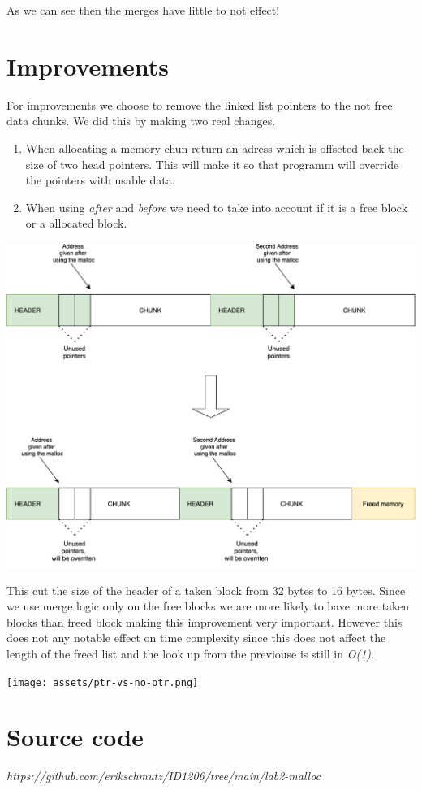 \documentclass{article}
\begin{document}
As we can see then the merges have little to not effect!

\section{Improvements}

For improvements we choose to remove the linked list pointers to the not free data chunks. We did this by making two real changes.

\begin{enumerate}
    \item When allocating a memory chun return an adress which is offseted back the size of two head pointers. This will make it so that programm will override the pointers with usable data.
    \item When using \emph{after} and \emph{before} we need to take into account if it is a free block or a allocated block. 
\end{enumerate}



\begin{center}
    \includegraphics[scale=0.12]{images/no-pointer-on-taken.png}
\end{center}
     
     
This cut the size of the header of a taken block from 32 bytes to 16 bytes. Since we use merge logic only on the free blocks we are more likely to have more taken blocks than freed block making this improvement very important. 
However this does not any notable effect on time complexity since this does not affect the length of the freed list and the look up from the previouse is still in \emph{O(1)}.

\begin{center}
    \texttt{[image: assets/ptr-vs-no-ptr.png]}
\end{center}

\section{Source code}


\emph{https://github.com/erikschmutz/ID1206/tree/main/lab2-malloc}
\end{document}
